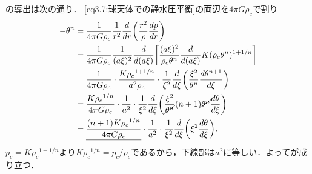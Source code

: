 の導出は次の通り．
\eqref{eq3.7:球天体での静水圧平衡}の両辺を$4\pi G\rho_c$で割り
\begin{align*}
    - \theta^n &= \frac{1}{4\pi G\rho_c} \frac{1}{r^2}\dv{r} \pqty{ \frac{r^2}{\rho} \dv{p}{r} } \\
    &= \frac{1}{4\pi G\rho_c} \frac{1}{(a\xi)^2} \dv{(a\xi)} \bqty{ \frac{(a\xi)^2}{\rho_c \theta^n} \dv{(a\xi)} K(\rho_c \theta^n)^{1+1/n} } \\
    &= \frac{1}{4\pi G\rho_c} \cdot \frac{K{\rho_c}^{1+1/n}}{a^2\rho_c} \cdot \frac{1}{\xi^2} \dv{\xi} \pqty{ \frac{\xi^2}{\theta^n} \dv{\theta^{n+1}}{\xi} } \\
    &= \frac{K{\rho_c}^{1/n}}{4\pi G\rho_c} \cdot \frac{1}{a^2} \cdot \frac{1}{\xi^2} \dv{\xi} \pqty{ \frac{\xi^2}{\cancel{\theta^n}} (n+1) \cancel{\theta^n} \dv{\theta}{\xi} } \\
    &= \underline{ \frac{(n+1)K{\rho_c}^{1/n}}{4\pi G\rho_c} } \cdot \frac{1}{a^2} \cdot \frac{1}{\xi^2} \dv{\xi} \pqty{ \xi^2 \dv{\theta}{\xi} } .
\end{align*}
$p_c = K {\rho_c}^{1+1/n}$より$K{\rho_c}^{1/n} = p_c/\rho_c$であるから，下線部は$a^2$に等しい．よってが成り立つ．




\BackToTheToc